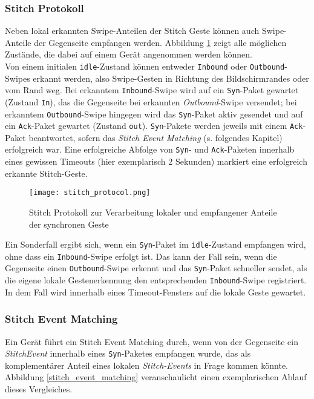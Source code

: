 {\subsubsection*{Stitch Protokoll}
Neben lokal erkannten Swipe-Anteilen der Stitch Geste können auch Swipe-Anteile der Gegenseite empfangen werden. Abbildung \ref{stitch_protocol} zeigt alle möglichen Zustände, die dabei auf einem Gerät angenommen werden können.\\

Von einem initialen \texttt{idle}-Zustand können entweder \texttt{Inbound} oder \texttt{Outbound}-Swipes erkannt werden, also Swipe-Gesten in Richtung des Bildschirmrandes oder vom Rand weg. Bei erkanntem \texttt{Inbound}-Swipe wird auf ein \texttt{Syn}-Paket gewartet (Zustand \texttt{In}), das die Gegenseite bei erkannten \textit{Outbound}-Swipe versendet; bei erkanntem \texttt{Outbound}-Swipe hingegen wird das \texttt{Syn}-Paket aktiv gesendet und auf ein \texttt{Ack}-Paket gewartet (Zustand \texttt{out}). \texttt{Syn}-Pakete werden jeweils mit einem \texttt{Ack}-Paket beantwortet, sofern das \textit{Stitch Event Matching} (s. folgendes Kapitel) erfolgreich war. Eine erfolgreiche Abfolge von \texttt{Syn}- und \texttt{Ack}-Paketen innerhalb eines gewissen Timeouts (hier exemplarisch 2 Sekunden) markiert eine erfolgreich erkannte Stitch-Geste.\\

\begin{figure}[h]
\texttt{[image: stitch\_protocol.png]}
\caption{Stitch Protokoll zur Verarbeitung lokaler und empfangener Anteile der synchronen Geste}
\label{stitch_protocol}
\end{figure}

Ein Sonderfall ergibt sich, wenn ein \texttt{Syn}-Paket im \texttt{idle}-Zustand empfangen wird, ohne dass ein \texttt{Inbound}-Swipe erfolgt ist. Das kann der Fall sein, wenn die Gegenseite einen \texttt{Outbound}-Swipe erkennt und das \texttt{Syn}-Paket schneller sendet, als die eigene lokale Gestenerkennung den entsprechenden \texttt{Inbound}-Swipe registriert. In dem Fall wird innerhalb eines Timeout-Fensters auf die lokale Geste gewartet.

\subsubsection*{Stitch Event Matching}
Ein Gerät führt ein Stitch Event Matching durch, wenn von der Gegenseite ein \textit{StitchEvent} innerhalb eines \texttt{Syn}-Paketes empfangen wurde, das als komplementärer Anteil eines lokalen \textit{Stitch-Events} in Frage kommen könnte. Abbildung \ref{stitch_event_matching} veranschaulicht einen exemplarischen Ablauf dieses Vergleiches.

}
